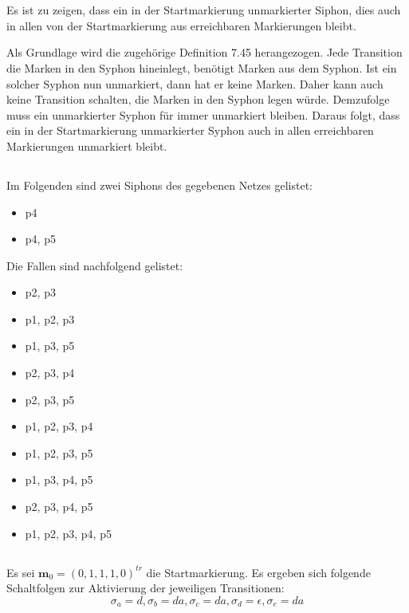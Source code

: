 \documentclass[10pt,a4paper,oneside,ngerman,numbers=noenddot]{scrartcl}
\begin{document}
\section{} %
\subsection{}
Es ist zu zeigen, dass ein in der Startmarkierung unmarkierter Siphon, dies auch in allen von der Startmarkierung aus erreichbaren Markierungen bleibt.

Als Grundlage wird die zugehörige Definition 7.45 herangezogen. Jede Transition die Marken in den Syphon hineinlegt, benötigt Marken aus dem Syphon. Ist ein solcher Syphon nun unmarkiert, dann hat er keine Marken. Daher kann auch keine Transition schalten, die Marken in den Syphon legen würde. Demzufolge muss ein unmarkierter Syphon für immer unmarkiert bleiben. Daraus folgt, dass ein in der Startmarkierung unmarkierter Syphon auch in allen erreichbaren Markierungen unmarkiert bleibt.

\subsection{}
Im Folgenden sind zwei Siphons des gegebenen Netzes gelistet:
\begin{itemize}
	\item p4
	\item p4, p5
\end{itemize}

Die Fallen sind nachfolgend gelistet:
\begin{itemize}
	\item p2, p3
	\item p1, p2, p3
	\item p1, p3, p5
	\item p2, p3, p4
	\item p2, p3, p5
	\item p1, p2, p3, p4
	\item p1, p2, p3, p5	
	\item p1, p3, p4, p5
	\item p2, p3, p4, p5
	\item p1, p2, p3, p4, p5
\end{itemize}

\subsection{}
Es sei \(\textbf{m}_0 = (0, 1, 1, 1, 0)^{tr}\) die Startmarkierung. Es ergeben sich folgende Schaltfolgen zur Aktivierung der jeweiligen Transitionen:
\[
	\sigma_a = d, \sigma_b = da, \sigma_c = da, \sigma_d = \epsilon, \sigma_e = da
\]
\section{} %
\end{document}
